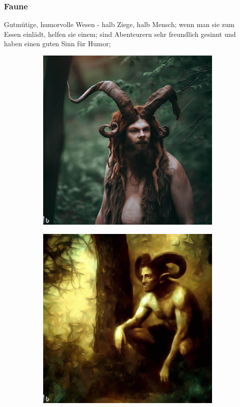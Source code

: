 \documentclass[11pt, twoside]{article}
\begin{document}
\subsubsection{Faune\label{faun}}
\label{sec:org5a04cda}
Gutmütige, humorvolle Wesen - halb Ziege, halb Mensch; wenn man sie zum Essen einlädt, helfen sie einem; sind Abenteurern sehr freundlich gesinnt und haben einen guten Sinn für Humor;
\begin{figure}[H]
\centering
\caption{Faune}
\label{fig:faun}
  \begin{subfigure}{0.3\textwidth}
    \centering
    \includegraphics[width=0.99\linewidth]{faun1.jpeg}
  \end{subfigure}%
  \begin{subfigure}{0.3\textwidth}
    \centering
    \includegraphics[width=0.99\linewidth]{faun2.jpeg}

\end{subfigure}
\end{figure}
\end{document}
